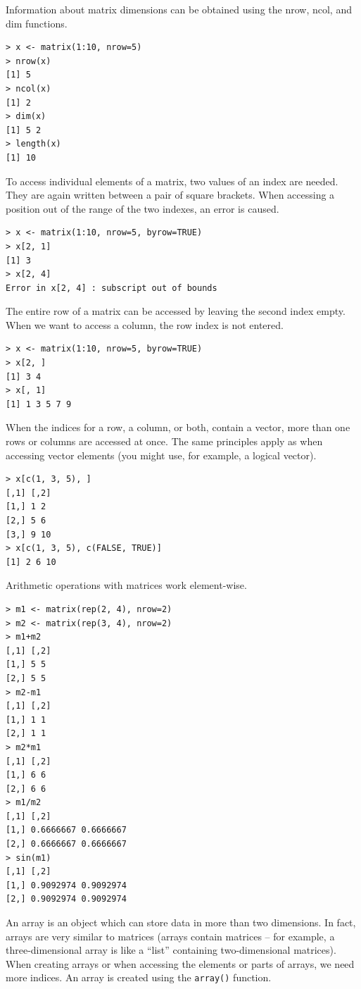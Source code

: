 Information about matrix dimensions can be obtained using the nrow, ncol,
and dim functions.

\begin{verbatim}
> x <- matrix(1:10, nrow=5)
> nrow(x)
[1] 5
> ncol(x)
[1] 2
> dim(x)
[1] 5 2
> length(x)
[1] 10
\end{verbatim}

To access individual elements of a matrix, two values of an index are needed.
They are again written between a pair of square brackets. When accessing a
position out of the range of the two indexes, an error is caused.

\begin{verbatim}
> x <- matrix(1:10, nrow=5, byrow=TRUE)
> x[2, 1]
[1] 3
> x[2, 4]
Error in x[2, 4] : subscript out of bounds
\end{verbatim}

The entire row of a matrix can be accessed by leaving the second index empty.
When we want to access a column, the row index is not entered.

\begin{verbatim}
> x <- matrix(1:10, nrow=5, byrow=TRUE)
> x[2, ]
[1] 3 4
> x[, 1]
[1] 1 3 5 7 9
\end{verbatim}

When the indices for a row, a column, or both, contain a vector, more than
one rows or columns are accessed at once. The same principles apply as when
accessing vector elements (you might use, for example, a logical vector).

\begin{verbatim}
> x[c(1, 3, 5), ]
[,1] [,2]
[1,] 1 2
[2,] 5 6
[3,] 9 10
> x[c(1, 3, 5), c(FALSE, TRUE)]
[1] 2 6 10
\end{verbatim}

Arithmetic operations with matrices work element-wise.

\begin{verbatim}
> m1 <- matrix(rep(2, 4), nrow=2)
> m2 <- matrix(rep(3, 4), nrow=2)
> m1+m2
[,1] [,2]
[1,] 5 5
[2,] 5 5
> m2-m1
[,1] [,2]
[1,] 1 1
[2,] 1 1
> m2*m1
[,1] [,2]
[1,] 6 6
[2,] 6 6
> m1/m2
[,1] [,2]
[1,] 0.6666667 0.6666667
[2,] 0.6666667 0.6666667
> sin(m1)
[,1] [,2]
[1,] 0.9092974 0.9092974
[2,] 0.9092974 0.9092974
\end{verbatim}

An array is an object which can store data in more than two dimensions. 
In fact, arrays are very similar to matrices (arrays contain matrices – for example, 
a three-dimensional array is like a ``list'' containing two-dimensional matrices). 
When creating arrays or when accessing the elements or parts of arrays, 
we need more indices. An array is created using the \texttt{array()} function.

